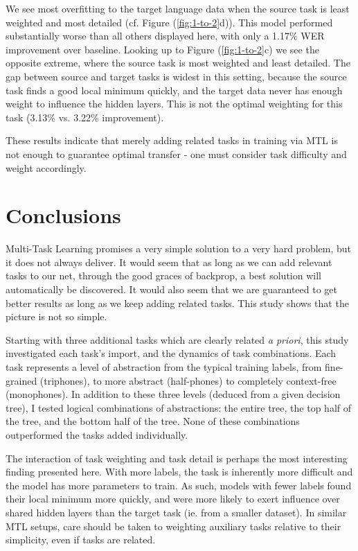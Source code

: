 \documentclass[a4paper]{article}
\begin{document}
We see most overfitting to the target language data when the source task is least weighted and most detailed (cf. Figure (\ref{fig:1-to-2}d)). This model performed substantially worse than all others displayed here, with only a 1.17\% WER improvement over baseline. Looking up to Figure (\ref{fig:1-to-2}c) we see the opposite extreme, where the source task is most weighted and least detailed. The gap between source and target tasks is widest in this setting, because the source task finds a good local minimum quickly, and the target data never has enough weight to influence the hidden layers. This is not the optimal weighting for this task (3.13\% vs. 3.22\% improvement).

These results indicate that merely adding related tasks in training via MTL is not enough to guarantee optimal transfer - one must consider task difficulty and weight accordingly. 




\section{Conclusions}

Multi-Task Learning promises a very simple solution to a very hard problem, but it does not always deliver. It would seem that as long as we can add relevant tasks to our net, through the good graces of backprop, a best solution will automatically be discovered. It would also seem that we are guaranteed to get better results as long as we keep adding related tasks. This study shows that the picture is not so simple.

Starting with three additional tasks which are clearly related \textit{a priori}, this study investigated each task's import, and the dynamics of task combinations. Each task represents a level of abstraction from the typical training labels, from fine-grained (triphones), to more abstract (half-phones) to completely context-free (monophones). In addition to these three levels (deduced from a given decision tree), I tested logical combinations of abstractions: the entire tree, the top half of the tree, and the bottom half of the tree. None of these combinations outperformed the tasks added individually.

The interaction of task weighting and task detail is perhaps the most interesting finding presented here. With more labels, the task is inherently more difficult and the model has more parameters to train. As such, models with fewer labels found their local minimum more quickly, and were more likely to exert influence over shared hidden layers than the target task (ie. from a smaller dataset). In similar MTL setups, care should be taken to weighting auxiliary tasks relative to their simplicity, even if tasks are related.
\end{document}
